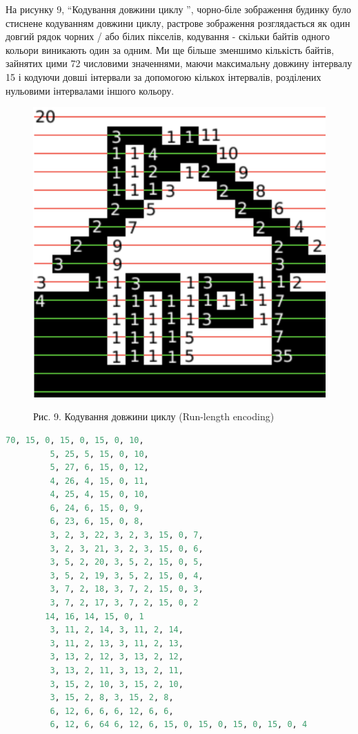 \documentclass[a4paper,12pt]{article}
\begin{document}
    На рисунку 9, “Кодування довжини циклу ”, чорно-біле зображення будинку було стиснене кодуванням довжини циклу, растрове зображення розглядається як один довгий рядок чорних / або білих пікселів, кодування - скільки байтів одного кольори виникають один за одним.
    Ми ще більше зменшимо кількість байтів, зайнятих цими 72 числовими значеннями, маючи максимальну довжину інтервалу 15 і кодуючи довші інтервали за допомогою кількох інтервалів, розділених нульовими інтервалами іншого кольору.
    \begin{figure}
        \label{fig:image9}
        \centering
        \includegraphics[scale=0.5]{image9.png}

        Рис. 9. Кодування довжини циклу (Run-length encoding)
    \end{figure}

    \begin{lstlisting}[style=light, language=Python,label={lst:vectorimg},caption=Кодування довжини циклу]
        70, 15, 0, 15, 0, 15, 0, 10,
         5, 25, 5, 15, 0, 10,
         5, 27, 6, 15, 0, 12,
         4, 26, 4, 15, 0, 11,
         4, 25, 4, 15, 0, 10,
         6, 24, 6, 15, 0, 9,
         6, 23, 6, 15, 0, 8,
         3, 2, 3, 22, 3, 2, 3, 15, 0, 7,
         3, 2, 3, 21, 3, 2, 3, 15, 0, 6,
         3, 5, 2, 20, 3, 5, 2, 15, 0, 5,
         3, 5, 2, 19, 3, 5, 2, 15, 0, 4,
         3, 7, 2, 18, 3, 7, 2, 15, 0, 3,
         3, 7, 2, 17, 3, 7, 2, 15, 0, 2
        14, 16, 14, 15, 0, 1
         3, 11, 2, 14, 3, 11, 2, 14,
         3, 11, 2, 13, 3, 11, 2, 13,
         3, 13, 2, 12, 3, 13, 2, 12,
         3, 13, 2, 11, 3, 13, 2, 11,
         3, 15, 2, 10, 3, 15, 2, 10,
         3, 15, 2, 8, 3, 15, 2, 8,
         6, 12, 6, 6, 6, 12, 6, 6,
         6, 12, 6, 64 6, 12, 6, 15, 0, 15, 0, 15, 0, 15, 0, 4
    \end{lstlisting}
\end{document}
